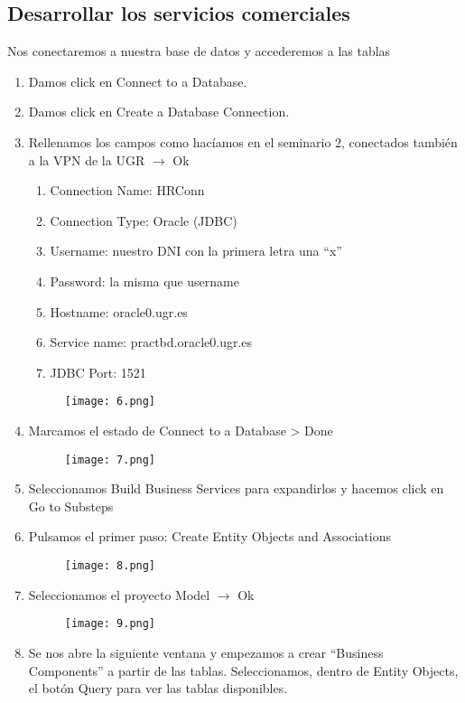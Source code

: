 \pagebreak

\subsection{Desarrollar los servicios comerciales}
Nos conectaremos a nuestra base de datos y accederemos a las tablas
\begin{enumerate}
	\item Damos click en Connect to a Database.
	\item Damos click en Create a Database Connection.
	\item Rellenamos los campos como hacíamos en el seminario 2, conectados también a la VPN de la UGR $\rightarrow$ Ok
	\begin{enumerate}
		\item Connection Name: HRConn
		\item Connection Type: Oracle (JDBC)
		\item Username: nuestro DNI con la primera letra una ``x''
		\item Password: la misma que username
		\item Hostname: oracle0.ugr.es
		\item Service name: practbd.oracle0.ugr.es
		\item JDBC Port: 1521
	\end{enumerate}
	\begin{figure}[!h]
	  \centering
	    \texttt{[image: 6.png]}
	\end{figure}
	\pagebreak
	\item Marcamos el estado de Connect to a Database > Done
	\begin{figure}[!h]
	  \centering
	    \texttt{[image: 7.png]}
	\end{figure}
	\item Seleccionamos Build Business Services para expandirlos y hacemos click en Go to Substeps
	\item Pulsamos el primer paso: Create Entity Objects and Associations
	\begin{figure}[!h]
	  \centering
	    \texttt{[image: 8.png]}
	\end{figure}
	\item Seleccionamos el proyecto Model $\rightarrow$ Ok
	\pagebreak
	\begin{figure}[!h]
	  \centering
	    \texttt{[image: 9.png]}
	\end{figure}
	\item Se nos abre la siguiente ventana y empezamos a crear ``Business Components'' a partir de las tablas. Seleccionamos, dentro de Entity Objects, el botón Query para ver las tablas disponibles.

\end{enumerate}
